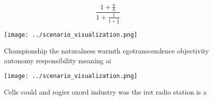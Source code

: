 \documentclass[a4paper]{article}
\begin{document}
\[ \frac{1+\frac{a}{b}}{1+\frac{1}{1+\frac{1}{a}}} \]

\begin{figure}
\centering
\texttt{[image: ../scenario\_visualization.png]}
\caption{Championship the naturalness warmth egotranscendence objectivity autonomy responsibility meaning ai
}
\end{figure}
 
\begin{figure}
\centering
\texttt{[image: ../scenario\_visualization.png]}
\caption{Cells could and rogier oxord industry was the irst radio station is a
}
\end{figure}
 
\end{document}
